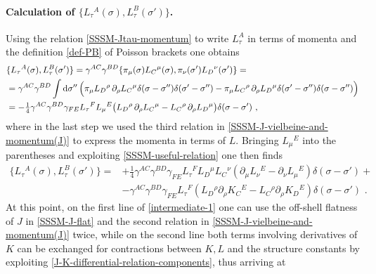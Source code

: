 \documentclass[12pt]{article}
\numberwithin{equation}{section}
\begin{document}
\paragraph{Calculation of $\{ L_{\tau}{}^{A}(\sigma),L_{\tau}^{B}(\sigma') \}$.}
Using the relation \eqref{SSSM-Jtau-momentum} to write $L_{\tau}^{A}$ in terms of momenta and the definition \eqref{def-PB} of Poisson brackets one obtains
\begin{align}\label{SSSM-Jtau-Jtau-bracket-starting-point}
&\{ L_{\tau}{}^{A}(\sigma) ,L_{\tau}^{B}(\sigma') \}=\gamma^{AC}\gamma^{BD}\{ \pi_{\mu}(\sigma)L_{C}{}^{\mu}(\sigma),\pi_{\nu}(\sigma')L_{D}{}^{\nu}(\sigma') \} =
\notag \\
& = \gamma^{AC}\gamma^{BD} \int \mathrm{d}\sigma'' \, \Bigl( \pi_{\mu} L_{D}{}^{\rho}\, \partial_{\rho}L_{C}{}^{\mu} \delta(\sigma-\sigma'')\delta(\sigma'-\sigma'')- \pi_{\mu} L_{C}{}^{\rho}\, \partial_{\rho}L_{D}{}^{\mu} \delta(\sigma'-\sigma'')\delta(\sigma-\sigma'')\Bigr)
\notag \\
& =-\tfrac{1}{4}\gamma^{AC}\gamma^{BD} \gamma_{FE}L_{\tau}{}^{F}L_{\mu}{}^{E}\bigl(L_{D}{}^{\rho}\, \partial_{\rho}L_{C}{}^{\mu}-L_{C}{}^{\rho}\, \partial_{\rho}L_{D}{}^{\mu}\bigr)\delta(\sigma-\sigma') \,\, ,
\end{align}
where in the last step we used the third relation in \eqref{SSSM-J-vielbeine-and-momentum(J)} to express the momenta in terms of $L$. Bringing $L_{\mu}{}^{E}$ into the parentheses and exploiting \eqref{SSSM-useful-relation} one then finds
\begin{equation}\label{intermediate-1}
\begin{aligned}
\{ L_{\tau}{}^{A}(\sigma) ,L_{\tau}^{B}(\sigma') \} =&+  \tfrac{1}{4}\gamma^{AC}\gamma^{BD} \gamma_{FE}L_{\tau}{}^{F}L_{D}{}^{\mu}L_{C}{}^{\nu}(\partial_{\mu}L_{\nu}{}^{E}-\partial_{\nu}L_{\mu}{}^{E})\delta(\sigma-\sigma')+
\\
& -\gamma^{AC}\gamma^{BD} \gamma_{FE}L_{\tau}{}^{F}(L_{D}{}^{\rho}\partial_{\rho}K_{C}{}^{E}-L_{C}{}^{\rho}\partial_{\rho}K_{D}{}^{E})\delta(\sigma-\sigma') \,\, .
\end{aligned}
\end{equation}
At this point, on the first line of \eqref{intermediate-1} one can use the off-shell flatness of $J$ in \eqref{SSSM-J-flat} and the second relation in \eqref{SSSM-J-vielbeine-and-momentum(J)} twice, while on the second line both terms involving derivatives of $K$ can be exchanged for contractions between $K,L$ and the structure constants by exploiting \eqref{J-K-differential-relation-components}, thus arriving at 
\end{document}
